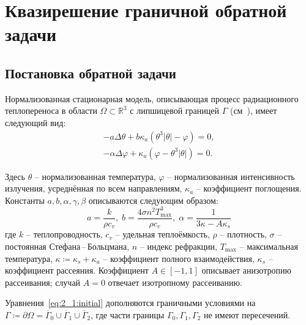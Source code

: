 \section{Квазирешение граничной обратной задачи}\label{sec:ch2/sec1}

\subsection{Постановка обратной задачи}\label{subsec:ch2/sec1/subsec1}

Нормализованная стационарная модель, описывающая процесс радиационного теплопереноса в
области $\Omega \subset \mathbb{R}^3$ с липшицевой границей $\Gamma$
(см~\cite{Pinnau2007}), имеет следующий вид:
\begin{equation}
    \label{eq:2_1:initial}
    \begin{aligned}
        - a \Delta \theta + b \kappa_a(\theta ^ 3 | \theta | - \varphi) = 0,  \\
        - \alpha \Delta \varphi + \kappa_a (\varphi - \theta ^3 | \theta |) = 0.
    \end{aligned}
\end{equation}

Здесь $\theta$ -- нормализованная температура, $\varphi$ -- нормализованная интенсивность излучения,
усреднённая по всем направлениям, $\kappa_a$ -- коэффициент поглощения.
Константы $a, b, \alpha, \gamma, \beta$ описываются следующим образом:
\[
    a = \frac{k}{\rho c_v}, \; b = \frac{4 \sigma n^2 T^3_{\max}}{\rho c_v}, \;
    \alpha = \frac{1}{3\kappa -A \kappa_s}
\]
где $k$ -- теплопроводность, $c_v$ -- удельная теплоёмкость, $\rho$ -- плотность,
$\sigma$ -- постоянная Стефана\,--\,Больцмана, $n$ -- индекс рефракции,
$T_{\max}$ -- максимальная температура,
$\kappa \coloneqq \kappa_s + \kappa_a$ -- коэффициент полного взаимодействия,
$\kappa_s$ -- коэффициент рассеяния.
Коэффициент $A \in [-1,1]$ описывает анизотропию рассеивания;
случай $A=0$ отвечает изотропному рассеиванию.

Уравнения~\eqref{eq:2_1:initial} дополняются граничными условиями на
$\Gamma \coloneqq \partial \Omega =\overline{\Gamma}_0 \cup \overline{\Gamma}_1 \cup \overline{\Gamma}_2$,
где части границы $\Gamma_0, \Gamma_1, \Gamma_2$ не имеют пересечений.

